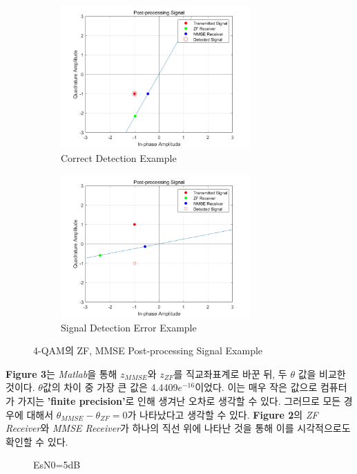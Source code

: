 \documentclass{article}
\newcommand{\bd}{\textbf} %
\begin{document}
\begin{figure}[!ht]
	\centering
	\begin{subfigure}{0.5\textwidth}
		\centerline{\includegraphics[width=0.8\textwidth]{4qam_correct.png}}
		\caption{Correct Detection Example}
	\end{subfigure}%
	\begin{subfigure}{0.5\textwidth}
		\centerline{\includegraphics[width=0.8\textwidth]{4qam_error.png}}
		\caption{Signal Detection Error Example}
	\end{subfigure}
	\caption{4-QAM의 ZF, MMSE Post-processing Signal Example}
\end{figure}

\bd{Figure 3}는 \textsl{Matlab}을 통해 $z_{MMSE}$와 $z_{ZF}$를 직교좌표계로 바꾼 뒤, 두 $\theta$ 값을 비교한 것이다. $\theta$값의 차이 중 가장 큰 값은 4.4409$e^{-16}$이었다. 이는 매우 작은 값으로 컴퓨터가 가지는 \bd{'finite precision'}로 인해 생겨난 오차로 생각할 수 있다. 그러므로 모든 경우에 대해서 $\theta_{MMSE}-\theta_{ZF}=0$가 나타났다고 생각할 수 있다. \bd{Figure 2}의 \textsl{ZF Receiver}와 \textsl{MMSE Receiver}가 하나의 직선 위에 나타난 것을 통해 이를 시각적으로도 확인할 수 있다.
\begin{figure}[h]
	\centering
	\caption{EsN0=5dB}
\end{figure}
\end{document}

